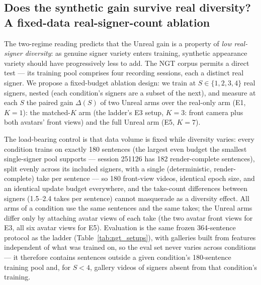 \subsection{Does the synthetic gain survive real diversity? A fixed-data
real-signer-count ablation}
\label{sec:ngt-signer-count}
The two-regime reading predicts that the Unreal gain is a property of
\emph{low real-signer diversity}: as genuine signer variety enters
training, synthetic appearance variety should have progressively less to
add. The NGT corpus permits a direct test --- its training pool comprises
four recording sessions, each a distinct real signer. We propose a
fixed-budget ablation design: we train at
$S \in \{1,2,3,4\}$ real signers, nested (each condition's signers are a
subset of the next), and measure at each $S$ the paired gain
$\Delta(S)$ of two Unreal arms over the real-only arm (E1, $K{=}1$): the
matched-$K$ arm (the ladder's E3 setup, $K{=}3$: front camera plus both
avatars' front views) and the full Unreal arm (E5, $K{=}7$).

The load-bearing control is that data volume is fixed while diversity
varies: every condition trains on exactly 180 sentences (the largest even
budget the smallest single-signer pool supports --- session 251126 has 182
render-complete sentences), split evenly across its included signers, with a
single (deterministic, render-complete)
take per sentence --- so 180 front-view videos, identical epoch size, and
an identical update budget everywhere, and the take-count differences
between signers (1.5--2.4 takes per sentence) cannot masquerade as a
diversity effect. All arms of a condition use the same sentences and the
same takes; the Unreal arms differ only by attaching avatar views of each
take (the two avatar front views for E3, all six avatar views for E5). Evaluation is the same frozen 364-sentence protocol as the
ladder (Table~\ref{tab:ngt_setups}),
with galleries built from features independent of what was trained on, so
the eval set never varies across conditions --- it therefore contains
sentences outside a given condition's 180-sentence training pool and, for
$S{<}4$, gallery videos of signers absent from that condition's training.


